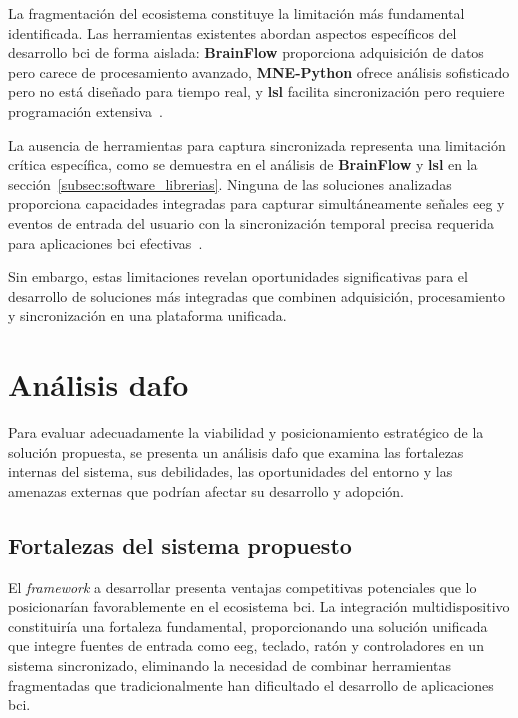 La fragmentación del ecosistema constituye la limitación más fundamental identificada. Las herramientas existentes abordan aspectos específicos del desarrollo \acrshort{bci} de forma aislada: \textbf{BrainFlow} proporciona adquisición de datos pero carece de procesamiento avanzado, \textbf{MNE-Python} ofrece análisis sofisticado pero no está diseñado para tiempo real, y \textbf{\acrshort{lsl}} facilita sincronización pero requiere programación extensiva~\cite{tangermann2012review}.

La ausencia de herramientas para captura sincronizada representa una limitación crítica específica, como se demuestra en el análisis de \textbf{BrainFlow} y \textbf{\acrshort{lsl}} en la sección~\ref{subsec:software_librerias}. Ninguna de las soluciones analizadas proporciona capacidades integradas para capturar simultáneamente señales \acrshort{eeg} y eventos de entrada del usuario con la sincronización temporal precisa requerida para aplicaciones \acrshort{bci} efectivas~\cite{chavarriaga2017heading}.

Sin embargo, estas limitaciones revelan oportunidades significativas para el desarrollo de soluciones más integradas que combinen adquisición, procesamiento y sincronización en una plataforma unificada.

\section[Análisis \acrshort{dafo}]{Análisis \acrfull{dafo}}
\label{sec:analisis_dafo}

Para evaluar adecuadamente la viabilidad y posicionamiento estratégico de la solución propuesta, se presenta un análisis \acrshort{dafo} que examina las fortalezas internas del sistema, sus debilidades, las oportunidades del entorno y las amenazas externas que podrían afectar su desarrollo y adopción.

\subsection{Fortalezas del sistema propuesto}
\label{subsec:fortalezas}

El \textit{\gls{framework}} a desarrollar presenta ventajas competitivas potenciales que lo posicionarían favorablemente en el ecosistema \acrshort{bci}. La integración multidispositivo constituiría una fortaleza fundamental, proporcionando una solución unificada que integre fuentes de entrada como \acrshort{eeg}, teclado, ratón y controladores en un sistema sincronizado, eliminando la necesidad de combinar herramientas fragmentadas que tradicionalmente han dificultado el desarrollo de aplicaciones \acrshort{bci}.


